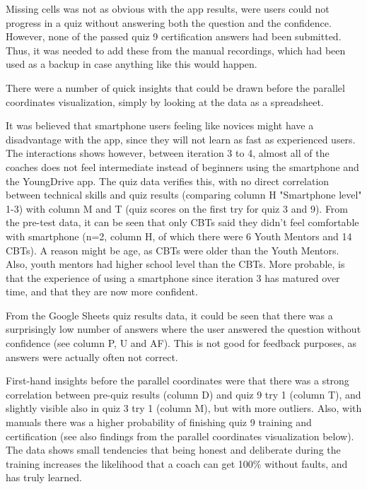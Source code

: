Missing cells was not as obvious with the app results, were users could not progress in a quiz without answering both the question and the confidence. However, none of the passed quiz 9 certification answers had been submitted. Thus, it was needed to add these from the manual recordings, which had been used as a backup in case anything like this would happen.

There were a number of quick insights that could be drawn before the parallel coordinates visualization, simply by looking at the data as a spreadsheet.

It was believed that smartphone users feeling like novices might have a disadvantage with the app, since they will not learn as fast as experienced users. The interactions shows however, between iteration 3 to 4, almost all of the coaches does not feel intermediate instead of beginners using the smartphone and the YoungDrive app. The quiz data verifies this, with no direct correlation between technical skills and quiz results (comparing column H "Smartphone level" 1-3) with column M and T (quiz scores on the first try for quiz 3 and 9). From the pre-test data, it can be seen that only CBTs said they didn't feel comfortable with smartphone (n=2, column H, of which there were 6 Youth Mentors and 14 CBTs). A reason might be age, as CBTs were older than the Youth Mentors. Also, youth mentors had higher school level than the CBTs. More probable, is that the experience of using a smartphone since iteration 3 has matured over time, and that they are now more confident. %

From the Google Sheets quiz results data, it could be seen that there was a surprisingly low number of answers where the user answered the question without confidence (see column P, U and AF). This is not good for feedback purposes, as answers were actually often not correct.

First-hand insights before the parallel coordinates were that there was a strong correlation between pre-quiz results (column D) and quiz 9 try 1 (column T), and slightly visible also in quiz 3 try 1 (column M), but with more outliers. Also, with manuals there was a higher probability of finishing quiz 9 training and certification (see also findings from the parallel coordinates visualization below). The data shows small tendencies that being honest and deliberate during the training increases the likelihood that a coach can get 100\% without faults, and has truly learned.

